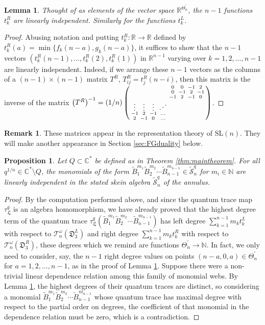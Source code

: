 \documentclass[12pt,
	]{amsart}
\newtheorem{proposition}[theorem]{Proposition}
\newtheorem{lemma}[theorem]{Lemma}
\theoremstyle{definition}
\newtheorem{remark}[theorem]{Remark}
\renewcommand{\tilde}{\widetilde}
\newcommand{\mrm}[1]{\mathrm{#1}}
\newcommand{\mbb}[1]{\mathbb{#1}}
\newcommand{\mcal}[1]{\mathcal{#1}}
\newcommand{\mfrak}[1]{\mathfrak{#1}}
\newcommand{\lp}{\left(}\newcommand{\rp}{\right)}
\newcommand{\bmat}{\lp\begin{smallmatrix}}\newcommand{\emat}{\end{smallmatrix}\rp}
\newcommand{\inv}[1]{#1^{-1}}
\newcommand{\nnegZ}{\mbb{N}}
\newcommand{\R}{\mbb{R}}
\newcommand{\C}{\mbb{C}}
\newcommand{\sC}{\C^\ast}
\newcommand{\nsl}{\mrm{SL}(n)}
\newcommand{\badset}{Q}
\newcommand{\qroot}{q^{1/n}}
\newcommand{\ssk}{\tilde{\mcal{S}}_n^q}
\newcommand{\ttriang}{\mfrak{D}_3}
\newcommand{\idealtriang}{\mfrak{L}}
\newcommand{\wroot}{\omega}
\newcommand{\qtorus}[1]{\mcal{T}_n^\wroot(#1)}
\newcommand{\qtr}{\tau^q_\idealtriang}
\newcommand{\discrete}{\Theta_n}
\newcommand{\cornerlessdiscrete}{\discrete^\prime}
\begin{document}
\begin{lemma}\label{lem:tropicalindependence}
Thought of as elements of the vector space $\R^{\cornerlessdiscrete}$, the $n-1$ functions $t^R_k$ are linearly independent.  Similarly for the functions $t^L_k$.  
\end{lemma}

\begin{proof}
Abusing notation and putting $t^R_k:\R\to\R$ defined by $t^R_k(a)=\min\{f_k(n-a),g_k(n-a)\}$, it suffices to show that the $n-1$ vectors $(t^R_k(n-1),\dots,t^R_k(2),t^R_k(1))$ in $\R^{n-1}$ varying over $k=1,2,\dots,n-1$ are linearly independent.  Indeed, if we arrange these $n-1$ vectors as the columns of a $(n-1)\times(n-1)$ matrix $T^R$, $T^R_{ij}=t^R_j(n-i)$, then this matrix is the inverse of the matrix $\inv{\lp T^R\rp}=(1/n)\bmat&&&&0&0&-1&2\\&&&&0&-1&2&-1\\&&&&-1&2&-1&0\\\vdots&\vdots&\vdots&\reflectbox{$\ddots$}&&&&\\-1&2&-1&\hdots&&&&\\2&-1&0&\hdots&&&&\emat$.  \end{proof}
\begin{remark}
These  matrices appear in the representation theory of  $\nsl$.  They will make another appearance in Section \ref{sec:FGduality} below.  
\end{remark}

\begin{proposition}\label{prop:second-main-result-independenceforstatedskeins}
Let $\badset\subset\sC$ be defined as in Theorem {\upshape\ref{thm:maintheorem}}.  For all $\qroot\in\sC\setminus\badset$, the monomials of the form $\tilde{B}_{1}^{m_1}\tilde{B}_{2}^{m_2}\cdots \tilde{B}_{n-1}^{m_{n-1}}\in\ssk$ for $m_i\in\nnegZ$ are linearly independent in the stated skein algebra $\ssk$ of the annulus.
\end{proposition}

\begin{proof}
By the computation performed above, and since the quantum trace map $\qtr$ is an algebra homomorphism, we have already proved that the highest degree term of the quantum trace $\qtr(\tilde{B}_{1}^{m_1}\tilde{B}_{2}^{m_2}\cdots \tilde{B}_{n-1}^{m_{n-1}})$ has left degree $\sum_{k=1}^{n-1} m_k t^L_k$ with respect to $\qtorus{\ttriang^L}$ and right degree $\sum_{k=1}^{n-1} m_k t^R_k$ with respect to $\qtorus{\ttriang^R}$, these degrees which we remind are functions $\cornerlessdiscrete\to\nnegZ$.  In fact, we only need to consider, say, the $n-1$ right degree values on points $(n-a,0,a)\in\cornerlessdiscrete$ for $a=1,2,\dots,n-1$, as in the proof of Lemma \ref{lem:tropicalindependence}.  Suppose there were a non-trivial linear dependence relation among this family of monomial webs.  By Lemma \ref{lem:tropicalindependence}, the highest degrees of their quantum traces are distinct, so considering a monomial $\tilde{B}_{1}^{m_1}\tilde{B}_{2}^{m_2}\cdots \tilde{B}_{n-1}^{m_{n-1}}$ whose quantum trace has maximal degree with respect to the partial order on degrees, the coefficient of that monomial in the dependence relation must be zero, which is a contradiction.  
\end{proof}
\end{document}
